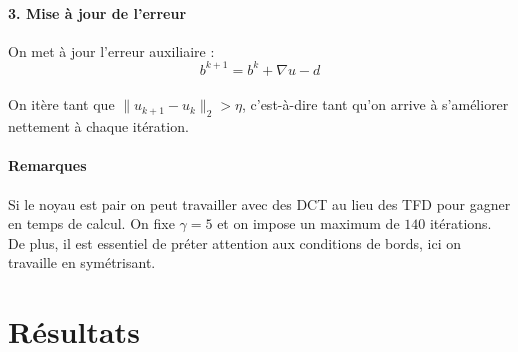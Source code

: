 \documentclass[a4paper,11pt]{article}
\begin{document}
\paragraph*{3. Mise à jour de l'erreur}
On met à jour l'erreur auxiliaire : 
$$b^{k+1} = b^k + \nabla u - d$$
\\
On itère tant que $\|u_{k+1}-u_k\|_2 > \eta$, c'est-à-dire tant qu'on arrive à s'améliorer nettement à chaque itération.

\paragraph*{Remarques} 
Si le noyau est pair on peut travailler avec des DCT au lieu des TFD pour gagner en temps de calcul. On fixe $\gamma = 5$ et on impose un maximum de $140$ itérations. De plus, il est essentiel de préter attention aux conditions de bords, ici on travaille en symétrisant.










\section{Résultats}
\end{document}
